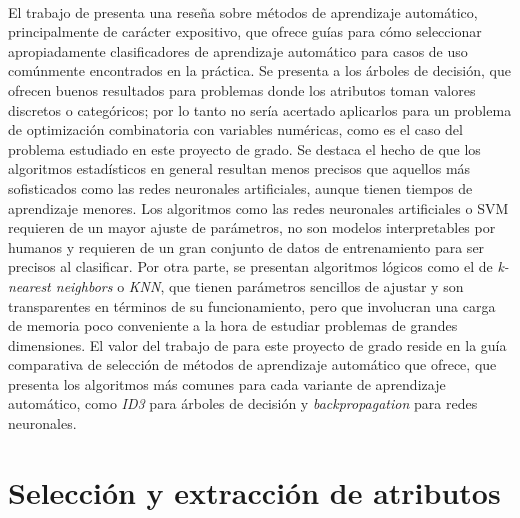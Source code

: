 \paragraph{}El trabajo de \citet{ml-survey} presenta una reseña sobre métodos de aprendizaje automático, principalmente de carácter expositivo, que ofrece guías para cómo seleccionar apropiadamente clasificadores de aprendizaje automático para casos de uso comúnmente encontrados en la práctica. Se presenta a los árboles de decisión, que ofrecen buenos resultados para problemas donde los atributos toman valores discretos o categóricos; por lo tanto no sería acertado aplicarlos para un problema de optimización combinatoria con variables numéricas, como es el caso del problema estudiado en este proyecto de grado. Se destaca el hecho de que los algoritmos estadísticos en general resultan menos precisos que aquellos más sofisticados como las redes neuronales artificiales, aunque tienen tiempos de aprendizaje menores. Los algoritmos como las redes neuronales artificiales o SVM requieren de un mayor ajuste de parámetros, no son modelos interpretables por humanos y requieren de un gran conjunto de datos de entrenamiento para ser precisos al clasificar. Por otra parte, se presentan algoritmos lógicos como el de \textit{k-nearest neighbors} o \textit{KNN}, que tienen parámetros sencillos de ajustar y son transparentes en términos de su funcionamiento, pero que involucran una carga de memoria poco conveniente a la hora de estudiar problemas de grandes dimensiones.
El valor del trabajo de \citet{ml-survey} para este proyecto de grado reside en la guía comparativa de selección de métodos de aprendizaje automático que ofrece, que presenta los algoritmos más comunes para cada variante de aprendizaje automático, como \textit{ID3} para árboles de decisión y \textit{backpropagation} para redes neuronales.


\section{Selección y extracción de atributos} \label{section-trabajos-seleccion-extraccion-atributos}

